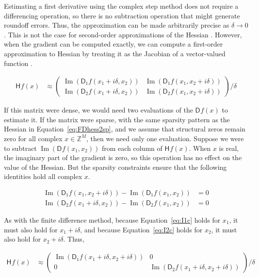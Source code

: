 \documentclass[jss]{jss}\usepackage[]{graphicx}\usepackage[]{color}
\newcommand{\parD}[3]{\mathsf{D}^{#1}_{#2}#3}
\newcommand{\hess}[2]{\mathsf{H}_{#1}#2}
\newcommand{\Complex}[1]{\mathbb{Z}^{#1}}
\DeclareMathOperator{\Imag}{Im}
\begin{document}
Estimating a first derivative using the complex step method does not
require a differencing operation, so there is no subtraction operation
that might generate roundoff errors.  Thus, the approximation can be
made arbitrarily precise as $\delta\rightarrow 0$ \citep{LaiCrassidis2008}.  This is not the
case for second-order approximations of
the Hessian \citep{AbreuStich2013}.  However, when the gradient can be
computed exactly, we can compute a first-order approximation to
Hessian by treating it as the Jacobian of
a vector-valued function \citep{LaiCrassidis2008}.

\begin{align}
  \label{eq:CShess2}
  \hess{}{f(x)}&\approx
  \begin{pmatrix}
    \Imag(\parD{}{1}{f(x_1+i\delta, x_2)})& \Imag(\parD{}{1}{f(x_1,x_2+i\delta)})\\
        \Imag(\parD{}{2}{f(x_1+i\delta, x_2)})&\Imag(\parD{}{2}{f(x_1,x_2+i\delta)})
    \end{pmatrix}/\delta
\end{align}

If this matrix were dense, we would need two evaluations of the
$\parD{}{}f(x)$ to estimate it.  If the matrix were sparse, with the same sparsity
pattern as the Hessian in Equation~\ref{eq:FDhess2sp}, and we
assume that structural zeros remain zero for all
complex $x\in\Complex{M}$, then we need only one evaluation.  Suppose
we were to subtract $\Imag(\parD{}{}{f(x_1,x_2)})$ from each column of
$\hess{}{f(x)}$. When $x$ is real, the imaginary part of the gradient
is zero, so this operation has no effect on the value of the
Hessian. But the sparsity constraints ensure that
the following identities hold all complex $x$.

\begin{align}
  \Imag(\parD{}{1}{f(x_1,x_2+i\delta)}) -\Imag(\parD{}{1}{f(x_1,x_2)})&=0\label{eq:I1c}\\
    \Imag(\parD{}{2}{f(x_1+i\delta,x_2)})-\Imag(\parD{}{2}{f(x_1,x_2)})&=0\label{eq:I2c}
\end{align}

As with the finite difference method, because Equation~\ref{eq:I1c} holds
for $x_1$, it must also hold for $x_1+i\delta$, and because Equation~\ref{eq:I2c} holds
for $x_2$, it must also hold for $x_2+i\delta$. Thus,

\begin{align}
  \label{eq:CShess2sp}
  \hess{}{f(x)}&\approx
  \begin{pmatrix}
    \Imag(\parD{}{1}{f(x_1+i\delta, x_2+i\delta)})&0\\
        0&\Imag(\parD{}{2}{f(x_1+i\delta,x_2+i\delta)})
    \end{pmatrix}/\delta
\end{align}
\end{document}
